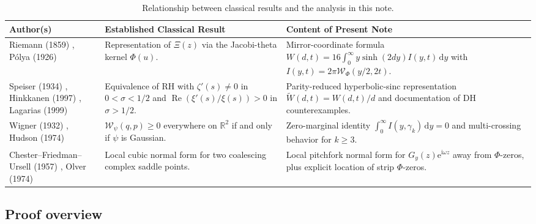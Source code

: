 \documentclass[11pt,a4paper,reqno]{amsart}
\theoremstyle{definition}
\theoremstyle{remark}
\numberwithin{equation}{section}
\newcommand{\dd}{\mathrm{d}}
\newcommand{\ii}{\mathrm{i}}
\newcommand{\ee}{\mathrm{e}}
\newcommand{\Rea}{\operatorname{Re}}
\newcommand{\Wig}{\mathcal{W}}
\newcommand{\Wtil}{\widetilde{W}}
\begin{document}
\begin{table}[htbp]
\centering
\caption{Relationship between classical results and the analysis in this note.}\label{tab:literature}
\footnotesize
\begin{tabular}{p{} p{} p{}}
\toprule
\textbf{Author(s)} & \textbf{Established Classical Result} & \textbf{Content of Present Note} \\
\midrule
Riemann (1859) \cite{Riemann1859}, P\'olya (1926) \cite{Polya1926} & Representation of $\Xi(z)$ via the Jacobi-theta kernel $\Phi(u)$. & Mirror-coordinate formula $W(d,t) = 16\int_0^\infty y\sinh(2d y)I(y,t)\,\dd y$ with $I(y,t) = 2\pi\Wig_\Phi(y/2,2t)$. \\
\addlinespace[3pt]
Speiser (1934) \cite{Speiser1934}, Hinkkanen (1997) \cite{Hinkkanen1997}, Lagarias (1999) \cite{Lagarias1999} & Equivalence of RH with $\zeta'(s) \neq 0$ in $0<\sigma<1/2$ and $\Rea(\xi'(s)/\xi(s)) > 0$ in $\sigma > 1/2$. & Parity-reduced hyperbolic-sinc representation $\Wtil(d,t) = W(d,t)/d$ and documentation of DH counterexamples. \\
\addlinespace[3pt]
Wigner (1932) \cite{Wigner1932}, Hudson (1974) \cite{Hudson1974} & $\Wig_\psi(q,p) \ge 0$ everywhere on $\mathbb{R}^2$ if and only if $\psi$ is Gaussian. & Zero-marginal identity $\int_0^\infty I(y,\gamma_k)\,\dd y = 0$ and multi-crossing behavior for $k \ge 3$. \\
\addlinespace[3pt]
Chester--Friedman--Ursell (1957) \cite{ChesterFriedmanUrsell1957}, Olver (1974) \cite{Olver1974} & Local cubic normal form for two coalescing complex saddle points. & Local pitchfork normal form for $G_y(z)\ee^{\ii\omega z}$ away from $\Phi$-zeros, plus explicit location of strip $\Phi$-zeros. \\
\bottomrule
\end{tabular}
\end{table}

\subsection{Proof overview}\label{subsec:overview}
\end{document}
